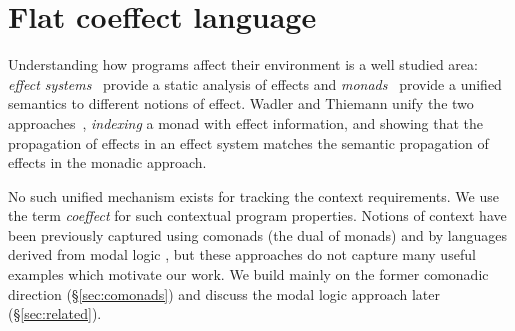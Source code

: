 \chapter{Flat coeffect language} 
\label{ch:flat} 


\newcommand{\iunit}{\mathsf{e}}
\newcommand{\imult}{\oplus}
\newcommand{\iftor}[1]{C^{#1}}
\newcommand{\iftorhat}[1]{\hat{C}^{#1}}

\newcommand{\cosem}[1]{\llbracket #1 \rrbracket}
\newcommand{\interp}[1]{\llbracket #1 \rrbracket}
\newcommand{\ccat}[0]{\mathcal{C}}
\newcommand{\obj}[1]{\textnormal{obj}(#1)}

\newcommand{\cobind}[2]{#1^\dagger_{#2}}
\newcommand{\cmerge}[0]{ \ident{m} }
\newcommand{\csplit}[0]{ \ident{n} }
\newcommand{\counit}[0]{ \varepsilon }





Understanding how programs affect their environment is a well studied area: \emph{effect 
systems}~\cite{effects-talpin-et-al} provide a static analysis of effects and 
\emph{monads}~\cite{monad-notions} provide a unified semantics to different notions of effect.  
Wadler and Thiemann unify the two approaches~\cite{monads-effects-marriage}, \emph{indexing}
a monad with effect information, and showing that the propagation of effects in an effect system 
matches the semantic propagation of effects in the monadic approach.

No such unified mechanism exists for tracking the context requirements. We use the term 
\emph{coeffect} for such contextual program properties. 
Notions of context have been previously captured using comonads
\cite{comonads-notions} (the dual of monads) 
and by languages derived from modal logic
\cite{logic-modal-reconstruction,logic-cmtt}, but these approaches
do not capture many useful examples which motivate our work. 
We build mainly on the former comonadic direction (\S\ref{sec:comonads}) and discuss the
modal logic approach later (\S\ref{sec:related}).

